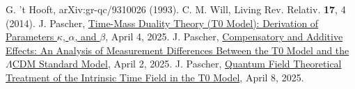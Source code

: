 \documentclass[12pt,a4paper]{article}
\begin{document}
\begin{thebibliography}{99}
		 G. 't Hooft, arXiv:gr-qc/9310026 (1993).
		 C. M. Will, Living Rev. Relativ. \textbf{17}, 4 (2014).
		 J. Pascher, \href{https://github.com/jpascher/T0-Time-Mass-Duality/tree/main/2/pdf/English/ZeitMasseT0ParamsEn.pdf}{Time-Mass Duality Theory (T0 Model): Derivation of Parameters \(\kappa\), \(\alpha\), and \(\beta\)}, April 4, 2025.
		 J. Pascher, \href{https://github.com/jpascher/T0-Time-Mass-Duality/tree/main/2/pdf/English/MessdifferenzenT0StandardEn.pdf}{Compensatory and Additive Effects: An Analysis of Measurement Differences Between the T0 Model and the \(\Lambda\)CDM Standard Model}, April 2, 2025.
				 J. Pascher, \href{https://github.com/jpascher/T0-Time-Mass-Duality/tree/main/2/pdf/English/QFTIntrinsischesZeitT0En.pdf}{Quantum Field Theoretical Treatment of the Intrinsic Time Field in the T0 Model}, April 8, 2025.
	\end{thebibliography}
	
\end{document}
